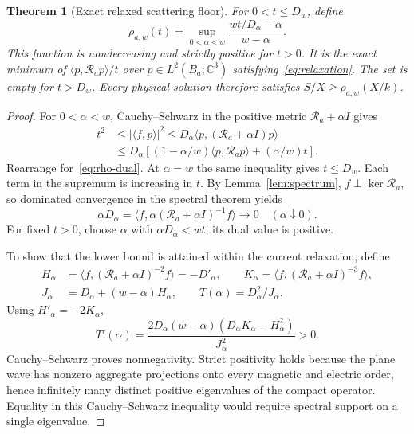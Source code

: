\documentclass[11pt]{article}
\newtheorem{theorem}{Theorem}[section]
\newcommand{\ip}[2]{\langle #1,#2\rangle}
\newcommand{\abs}[1]{\lvert #1\rvert}
\begin{document}
\begin{theorem}[Exact relaxed scattering floor]\label{thm:floor}
For $0<t\leq D_w$, define
\begin{equation}\label{eq:rho-dual}
 \rho_{a,w}(t)=\sup_{0<\alpha<w}
 \frac{wt/D_\alpha-\alpha}{w-\alpha}.
\end{equation}
This function is nondecreasing and strictly positive for $t>0$. It is the exact minimum of $\ip p{\mathcal R_ap}/t$ over $p\in L^2(B_a;\mathbb C^3)$ satisfying~\eqref{eq:relaxation}. The set is empty for $t>D_w$. Every physical solution therefore satisfies $S/X\geq\rho_{a,w}(X/k)$.
\end{theorem}
\begin{proof}
For $0<\alpha<w$, Cauchy--Schwarz in the positive metric $\mathcal R_a+\alpha I$ gives
\begin{align*}
 t^2&\leq\abs{\ip f p}^2
 \leq D_\alpha\ip p{(\mathcal R_a+\alpha I)p}\\
 &\leq D_\alpha\left[(1-\alpha/w)\ip p{\mathcal R_ap}+(\alpha/w)t\right].
\end{align*}
Rearrange for~\eqref{eq:rho-dual}. At $\alpha=w$ the same inequality gives $t\leq D_w$. Each term in the supremum is increasing in $t$. By Lemma~\ref{lem:spectrum}, $f\perp\ker\mathcal R_a$, so dominated convergence in the spectral theorem yields
\[
 \alpha D_\alpha=\ip f{\alpha(\mathcal R_a+\alpha I)^{-1}f}\longrightarrow0
 \quad(\alpha\downarrow0).
\]
For fixed $t>0$, choose $\alpha$ with $\alpha D_\alpha<wt$; its dual value is positive.

To show that the lower bound is attained within the current relaxation, define
\begin{align*}
 H_\alpha&=\ip f{(\mathcal R_a+\alpha I)^{-2}f}=-D'_\alpha,\qquad
 K_\alpha=\ip f{(\mathcal R_a+\alpha I)^{-3}f},\\
 J_\alpha&=D_\alpha+(w-\alpha)H_\alpha,\qquad
 T(\alpha)=D_\alpha^2/J_\alpha.
\end{align*}
Using $H'_\alpha=-2K_\alpha$,
\begin{equation}\label{eq:Tderivative}
 T'(\alpha)=\frac{2D_\alpha(w-\alpha)(D_\alpha K_\alpha-H_\alpha^2)}{J_\alpha^2}>0.
\end{equation}
Cauchy--Schwarz proves nonnegativity. Strict positivity holds because the plane wave has nonzero aggregate projections onto every magnetic and electric order, hence infinitely many distinct positive eigenvalues of the compact operator. Equality in this Cauchy--Schwarz inequality would require spectral support on a single eigenvalue.


\end{proof}
\end{document}
